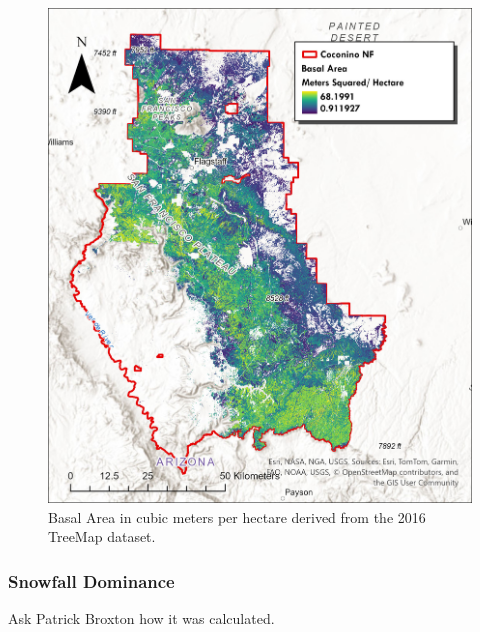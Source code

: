 \documentclass[
  number]{elsarticle}
\begin{document}
\begin{figure}[H]

{\centering \includegraphics{images/Basal_Area.jpg}

}

\caption{Basal Area in cubic meters per hectare derived from the 2016
TreeMap dataset.}

\end{figure}%

\subsubsection{Snowfall Dominance}\label{snowfall-dominance}

Ask Patrick Broxton how it was calculated.
\end{document}
